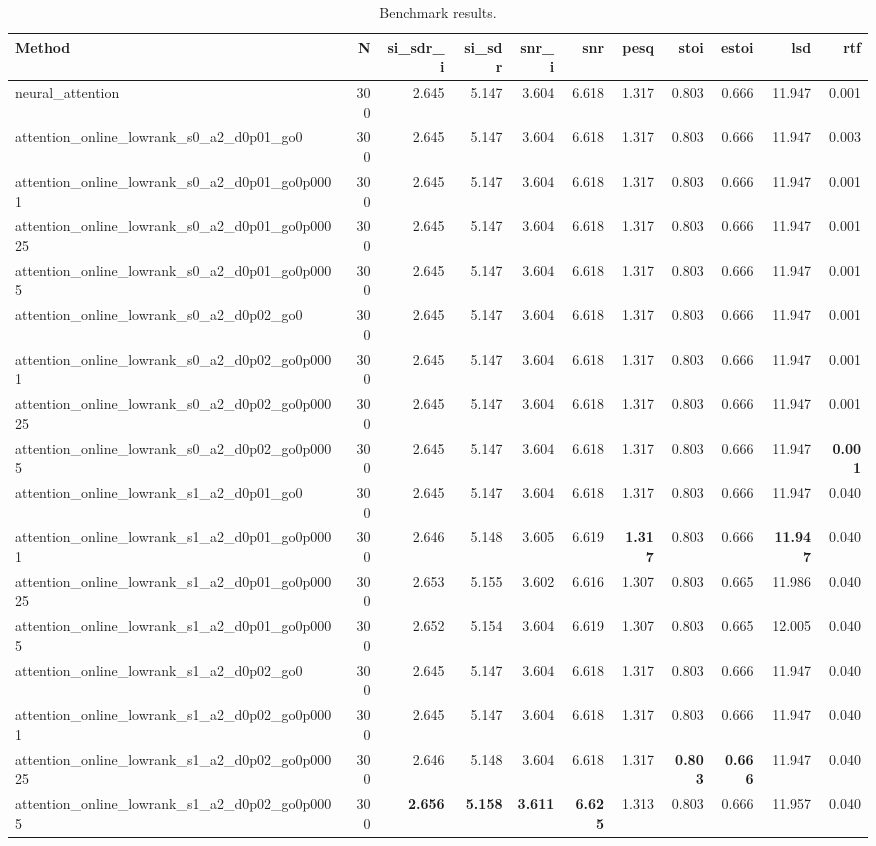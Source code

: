 \begin{table}[t]
\centering
\caption{Benchmark results.}
\label{tab:bench}
\begin{tabular}{lrrrrrrrrrr}
\toprule
Method & N & si\_sdr\_i & si\_sdr & snr\_i & snr & pesq & stoi & estoi & lsd & rtf \\
\midrule
neural_attention & 300 & 2.645 & 5.147 & 3.604 & 6.618 & 1.317 & 0.803 & 0.666 & 11.947 & 0.001 \\
attention_online_lowrank_s0_a2_d0p01_go0 & 300 & 2.645 & 5.147 & 3.604 & 6.618 & 1.317 & 0.803 & 0.666 & 11.947 & 0.003 \\
attention_online_lowrank_s0_a2_d0p01_go0p0001 & 300 & 2.645 & 5.147 & 3.604 & 6.618 & 1.317 & 0.803 & 0.666 & 11.947 & 0.001 \\
attention_online_lowrank_s0_a2_d0p01_go0p00025 & 300 & 2.645 & 5.147 & 3.604 & 6.618 & 1.317 & 0.803 & 0.666 & 11.947 & 0.001 \\
attention_online_lowrank_s0_a2_d0p01_go0p0005 & 300 & 2.645 & 5.147 & 3.604 & 6.618 & 1.317 & 0.803 & 0.666 & 11.947 & 0.001 \\
attention_online_lowrank_s0_a2_d0p02_go0 & 300 & 2.645 & 5.147 & 3.604 & 6.618 & 1.317 & 0.803 & 0.666 & 11.947 & 0.001 \\
attention_online_lowrank_s0_a2_d0p02_go0p0001 & 300 & 2.645 & 5.147 & 3.604 & 6.618 & 1.317 & 0.803 & 0.666 & 11.947 & 0.001 \\
attention_online_lowrank_s0_a2_d0p02_go0p00025 & 300 & 2.645 & 5.147 & 3.604 & 6.618 & 1.317 & 0.803 & 0.666 & 11.947 & 0.001 \\
attention_online_lowrank_s0_a2_d0p02_go0p0005 & 300 & 2.645 & 5.147 & 3.604 & 6.618 & 1.317 & 0.803 & 0.666 & 11.947 & \textbf{0.001} \\
attention_online_lowrank_s1_a2_d0p01_go0 & 300 & 2.645 & 5.147 & 3.604 & 6.618 & 1.317 & 0.803 & 0.666 & 11.947 & 0.040 \\
attention_online_lowrank_s1_a2_d0p01_go0p0001 & 300 & 2.646 & 5.148 & 3.605 & 6.619 & \textbf{1.317} & 0.803 & 0.666 & \textbf{11.947} & 0.040 \\
attention_online_lowrank_s1_a2_d0p01_go0p00025 & 300 & 2.653 & 5.155 & 3.602 & 6.616 & 1.307 & 0.803 & 0.665 & 11.986 & 0.040 \\
attention_online_lowrank_s1_a2_d0p01_go0p0005 & 300 & 2.652 & 5.154 & 3.604 & 6.619 & 1.307 & 0.803 & 0.665 & 12.005 & 0.040 \\
attention_online_lowrank_s1_a2_d0p02_go0 & 300 & 2.645 & 5.147 & 3.604 & 6.618 & 1.317 & 0.803 & 0.666 & 11.947 & 0.040 \\
attention_online_lowrank_s1_a2_d0p02_go0p0001 & 300 & 2.645 & 5.147 & 3.604 & 6.618 & 1.317 & 0.803 & 0.666 & 11.947 & 0.040 \\
attention_online_lowrank_s1_a2_d0p02_go0p00025 & 300 & 2.646 & 5.148 & 3.604 & 6.618 & 1.317 & \textbf{0.803} & \textbf{0.666} & 11.947 & 0.040 \\
attention_online_lowrank_s1_a2_d0p02_go0p0005 & 300 & \textbf{2.656} & \textbf{5.158} & \textbf{3.611} & \textbf{6.625} & 1.313 & 0.803 & 0.666 & 11.957 & 0.040 \\
\bottomrule
\end{tabular}
\end{table}